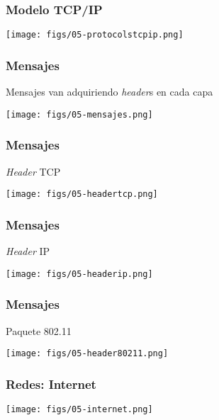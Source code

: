 \documentclass[letter]{beamer}
\begin{document}
\begin{frame}
  \frametitle{Modelo TCP/IP}

  \begin{center}
    \texttt{[image: figs/05-protocolstcpip.png]}
  \end{center}

\end{frame}
\begin{frame}
  \frametitle{Mensajes}

  Mensajes van adquiriendo {\em header}s en cada capa
  
  \begin{center}
    \texttt{[image: figs/05-mensajes.png]}
  \end{center}

\end{frame}

\begin{frame}
  \frametitle{Mensajes}

  {\em Header} TCP

  \begin{center}
    \texttt{[image: figs/05-headertcp.png]}
  \end{center}

\end{frame}
\begin{frame}
  \frametitle{Mensajes}

  {\em Header} IP
  
  \begin{center}
    \texttt{[image: figs/05-headerip.png]}
  \end{center}
  

\end{frame}
\begin{frame}
  \frametitle{Mensajes}

  Paquete 802.11

  \begin{center}
    \texttt{[image: figs/05-header80211.png]}
  \end{center}
  
  

\end{frame}
\begin{frame}
  \frametitle{Redes: Internet}

  \begin{center}
    \texttt{[image: figs/05-internet.png]}
  \end{center}

\end{frame}
\end{document}

